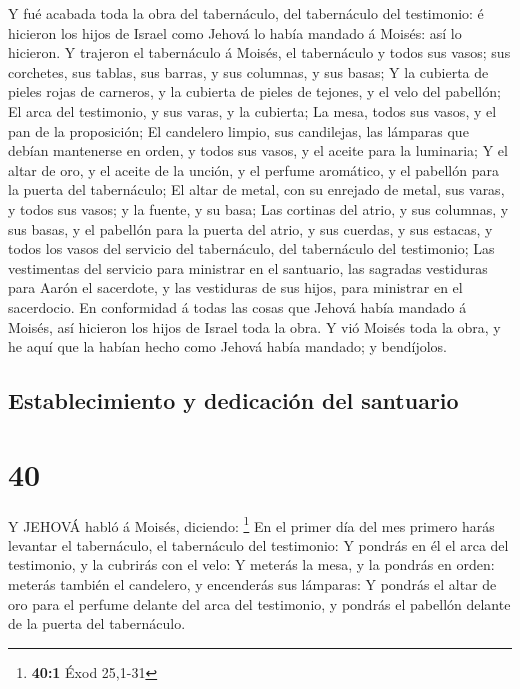  Y fué acabada toda la obra del tabernáculo, del
tabernáculo del testimonio: é hicieron los hijos de Israel como Jehová
lo había mandado á Moisés: así lo hicieron.  Y trajeron el
tabernáculo á Moisés, el tabernáculo y todos sus vasos; sus corchetes,
sus tablas, sus barras, y sus columnas, y sus basas;  Y la
cubierta de pieles rojas de carneros, y la cubierta de pieles de
tejones, y el velo del pabellón;  El arca del testimonio, y
sus varas, y la cubierta;  La mesa, todos sus vasos, y el
pan de la proposición;  El candelero limpio, sus
candilejas, las lámparas que debían mantenerse en orden, y todos sus
vasos, y el aceite para la luminaria;  Y el altar de oro, y
el aceite de la unción, y el perfume aromático, y el pabellón para la
puerta del tabernáculo;  El altar de metal, con su enrejado
de metal, sus varas, y todos sus vasos; y la fuente, y su basa;
 Las cortinas del atrio, y sus columnas, y sus basas, y el
pabellón para la puerta del atrio, y sus cuerdas, y sus estacas, y todos
los vasos del servicio del tabernáculo, del tabernáculo del testimonio;
 Las vestimentas del servicio para ministrar en el
santuario, las sagradas vestiduras para Aarón el sacerdote, y las
vestiduras de sus hijos, para ministrar en el sacerdocio. 
En conformidad á todas las cosas que Jehová había mandado á Moisés, así
hicieron los hijos de Israel toda la obra.  Y vió Moisés
toda la obra, y he aquí que la habían hecho como Jehová había mandado; y
bendíjolos.

\hypertarget{establecimiento-y-dedicaciuxf3n-del-santuario}{%
\subsection{Establecimiento y dedicación del
santuario}\label{establecimiento-y-dedicaciuxf3n-del-santuario}}

\hypertarget{section-39}{%
\section{40}\label{section-39}}

 Y JEHOVÁ habló á Moisés, diciendo: \footnote{\textbf{40:1}
  Éxod 25,1-31}  En el primer día del mes primero harás
levantar el tabernáculo, el tabernáculo del testimonio:  Y
pondrás en él el arca del testimonio, y la cubrirás con el velo:
 Y meterás la mesa, y la pondrás en orden: meterás también
el candelero, y encenderás sus lámparas:  Y pondrás el altar
de oro para el perfume delante del arca del testimonio, y pondrás el
pabellón delante de la puerta del tabernáculo.

